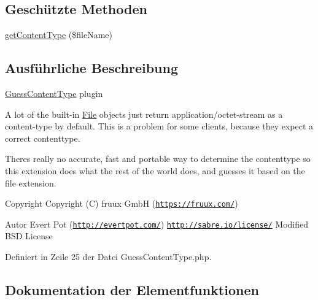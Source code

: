 \subsection*{Geschützte Methoden}
\begin{DoxyCompactItemize}
\item 
\mbox{\hyperlink{class_sabre_1_1_d_a_v_1_1_browser_1_1_guess_content_type_afbdfcf2103442a5fb32ed6d905fedb2f}{get\+Content\+Type}} (\$file\+Name)
\end{DoxyCompactItemize}


\subsection{Ausführliche Beschreibung}
\mbox{\hyperlink{class_sabre_1_1_d_a_v_1_1_browser_1_1_guess_content_type}{Guess\+Content\+Type}} plugin

A lot of the built-\/in \mbox{\hyperlink{class_sabre_1_1_d_a_v_1_1_file}{File}} objects just return application/octet-\/stream as a content-\/type by default. This is a problem for some clients, because they expect a correct contenttype.

There\textquotesingle{}s really no accurate, fast and portable way to determine the contenttype so this extension does what the rest of the world does, and guesses it based on the file extension.

\begin{DoxyCopyright}{Copyright}
Copyright (C) fruux GmbH (\href{https://fruux.com/}{\tt https\+://fruux.\+com/}) 
\end{DoxyCopyright}
\begin{DoxyAuthor}{Autor}
Evert Pot (\href{http://evertpot.com/}{\tt http\+://evertpot.\+com/})  \href{http://sabre.io/license/}{\tt http\+://sabre.\+io/license/} Modified B\+SD License 
\end{DoxyAuthor}


Definiert in Zeile 25 der Datei Guess\+Content\+Type.\+php.



\subsection{Dokumentation der Elementfunktionen}
\mbox{\label{class_sabre_1_1_d_a_v_1_1_browser_1_1_guess_content_type_afbdfcf2103442a5fb32ed6d905fedb2f}} 
